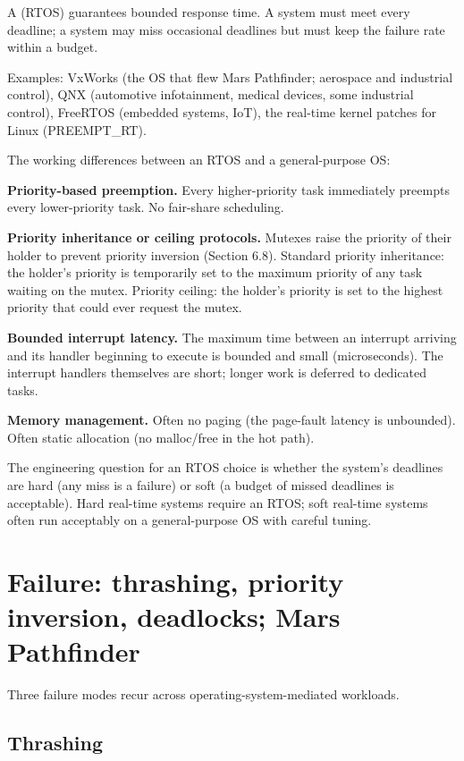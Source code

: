 A  (RTOS) guarantees bounded response time. A  system must meet every deadline; a  system may miss occasional deadlines but must keep the failure rate within a budget.

Examples: VxWorks (the OS that flew Mars Pathfinder; aerospace and industrial control), QNX (automotive infotainment, medical devices, some industrial control), FreeRTOS (embedded systems, IoT), the real-time kernel patches for Linux (PREEMPT\_RT).

The working differences between an RTOS and a general-purpose OS:

\textbf{Priority-based preemption.} Every higher-priority task immediately preempts every lower-priority task. No fair-share scheduling.

\textbf{Priority inheritance or ceiling protocols.} Mutexes raise the priority of their holder to prevent priority inversion (Section 6.8). Standard priority inheritance: the holder's priority is temporarily set to the maximum priority of any task waiting on the mutex. Priority ceiling: the holder's priority is set to the highest priority that could ever request the mutex.

\textbf{Bounded interrupt latency.} The maximum time between an interrupt arriving and its handler beginning to execute is bounded and small (microseconds). The interrupt handlers themselves are short; longer work is deferred to dedicated tasks.

\textbf{Memory management.} Often no paging (the page-fault latency is unbounded). Often static allocation (no malloc/free in the hot path).

The engineering question for an RTOS choice is whether the system's deadlines are hard (any miss is a failure) or soft (a budget of missed deadlines is acceptable). Hard real-time systems require an RTOS; soft real-time systems often run acceptably on a general-purpose OS with careful tuning.

\section{Failure: thrashing, priority inversion, deadlocks; Mars Pathfinder}

Three failure modes recur across operating-system-mediated workloads.

\subsection{Thrashing}

